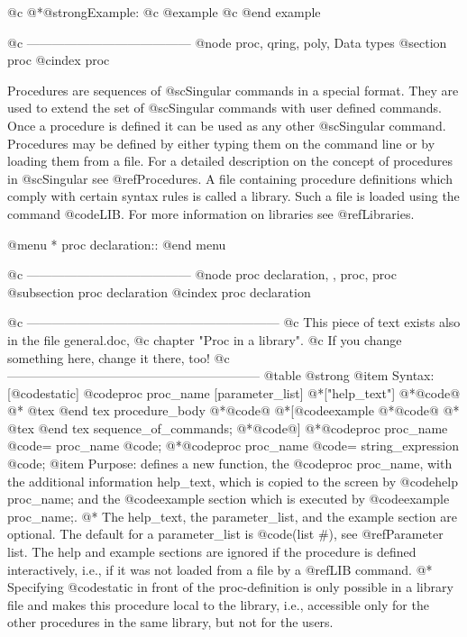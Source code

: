 {{{{{{@c @*@strong{Example:}
@c @example
@c @end example

@c ---------------------------------------
@node proc, qring, poly, Data types
@section proc
@cindex proc

Procedures are sequences of @sc{Singular} commands in a special
format. They are used to extend the set of @sc{Singular} commands with
user defined commands. Once a procedure is defined it can be used as
any other @sc{Singular} command. Procedures may be defined by either
typing them on the command line or by loading them from a file. For a
detailed description on the concept of procedures in @sc{Singular} see
@ref{Procedures}. A file containing procedure definitions which comply with
certain syntax rules is called a library. Such a file is loaded
using the command @code{LIB}. For more information on libraries see
@ref{Libraries}.

@menu
* proc declaration::
@end menu

@c ---------------------------------------
@node proc declaration,  , proc, proc
@subsection proc declaration
@cindex proc declaration

@c ------------------------------------------------------------
@c   This piece of text exists also in the file general.doc,
@c   chapter "Proc in a library".
@c   If you change something here, change it there, too!
@c ------------------------------------------------------------
@table @strong
@item Syntax:
[@code{static}] @code{proc} proc_name [parameter_list]
@*["help_text"]
@*@code{@{}
@*
@tex
\quad
@end tex
   procedure_body
@*@code{@}}
@*[@code{example}
@*@code{@{}
@*
@tex
\quad
@end tex
   sequence_of_commands;
@*@code{@}}]
@*@code{proc} proc_name @code{=} proc_name @code{;}
@*@code{proc} proc_name @code{=} string_expression @code{;}
@item Purpose:
defines a new function, the @code{proc} proc_name, with the additional
information help_text, which is copied to the screen by
@code{help proc_name;} and the @code{example} section
which is executed by @code{example proc_name;}.
@* The help_text, the parameter_list, and the example section are optional.
The default for a parameter_list is @code{(list #)}, see @ref{Parameter list}.
The help and example sections are ignored if the procedure is defined
interactively, i.e., if it was not loaded from a file by a @ref{LIB} command.
@* Specifying @code{static} in front of the proc-definition is only possible
in a library file and makes this procedure local to the library,
i.e., accessible only for the other procedures in the same library,
but not for the users.

}}}}}}

